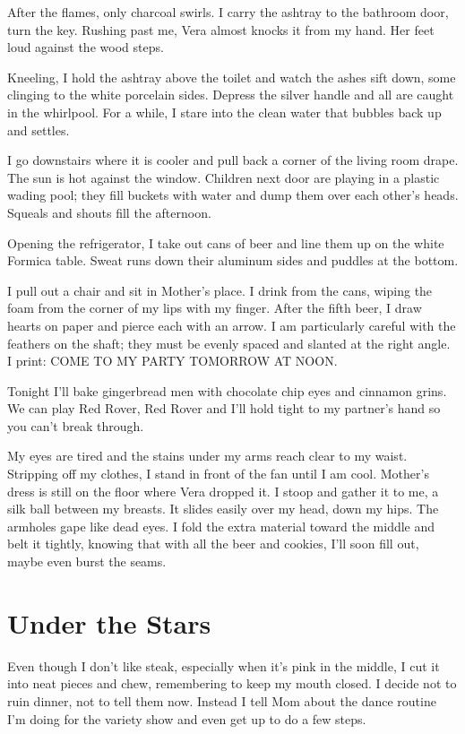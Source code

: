 \documentclass[twoside,10pt]{book}
\begin{document}
After the flames, only charcoal swirls. I carry the ashtray to the
bathroom door, turn the key. Rushing past me, Vera almost knocks it from
my hand. Her feet loud against the wood steps.

Kneeling, I hold the ashtray above the toilet and watch the ashes sift
down, some clinging to the white porcelain sides. Depress the silver
handle and all are caught in the whirlpool. For a while, I stare into
the clean water that bubbles back up and settles.

I go downstairs where it is cooler and pull back a corner of the living
room drape. The sun is hot against the window. Children next door are
playing in a plastic wading pool; they fill buckets with water and dump
them over each other's heads. Squeals and shouts fill the afternoon.

Opening the refrigerator, I take out cans of beer and line them up on
the white Formica table. Sweat runs down their aluminum sides and
puddles at the bottom.

I pull out a chair and sit in Mother's place. I drink from the cans,
wiping the foam from the corner of my lips with my finger. After the
fifth beer, I draw hearts on paper and pierce each with an arrow. I am
particularly careful with the feathers on the shaft; they must be evenly
spaced and slanted at the right angle. I print: COME TO MY PARTY
TOMORROW AT NOON.

Tonight I'll bake gingerbread men with chocolate chip eyes and cinnamon
grins. We can play Red Rover, Red Rover and I'll hold tight to my
partner's hand so you can't break through.

My eyes are tired and the stains under my arms reach clear to my waist.
Stripping off my clothes, I stand in front of the fan until I am cool.
Mother's dress is still on the floor where Vera dropped it. I stoop and
gather it to me, a silk ball between my breasts. It slides easily over
my head, down my hips. The armholes gape like dead eyes. I fold the
extra material toward the middle and belt it tightly, knowing that with
all the beer and cookies, I'll soon fill out, maybe even burst the
seams.


\cleardoublepage
\chapter{Under the Stars}

Even though I don't like steak, especially when it's pink in the middle,
I cut it into neat pieces and chew, remembering to keep my mouth closed.
I decide not to ruin dinner, not to tell them now. Instead I tell Mom
about the dance routine I'm doing for the variety show and even get up
to do a few steps.
\end{document}
